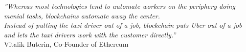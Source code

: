 \cleardoublepage
\thispagestyle{plain}

\vspace*{6cm}

\begin{flushright}
   \textsl{''Whereas most technologies tend to automate workers on the periphery doing menial tasks, blockchains automate away the center. \\
           Instead of putting the taxi driver out of a job, blockchain puts Uber out of a job and lets the taxi drivers work with the customer directly.''} \\
\vspace*{1.5cm}
           Vitalik Buterin, Co-Founder of Ethereum
\end{flushright}


\vspace*{2cm}

\begin{comment}

\begin{flushright}
   \textsl{''The blockchain symbolizes a shift in power from the centers \\ to the edges of the networks.''} \\
\vspace*{1.5cm}
           William Mougayar, Chair, Kin Foundation
\end{flushright}

\vspace*{2cm}

\begin{flushright}
   \textsl{''Online identity and reputation will be decentralized. \\We will own the data that belongs to us.''} \\
\vspace*{1.5cm}
           William Mougayar, Chair, Kin Foundation
\end{flushright}

\end{comment}
